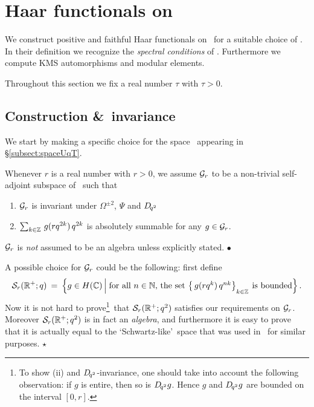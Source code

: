 
\section{Haar functionals on \protect\Uqext}

\begin{abs_chp}
We construct positive and faithful Haar functionals on \UqT\ for a suitable choice of \calL\@.
In their definition we recognize the {\em spectral conditions\/} of
\cite{Fons:spectral_conditions,Wor:QE2}\@.
Furthermore we compute {\scriptsize KMS} automorphisms and modular elements.
\end{abs_chp}

Throughout this section we fix a real number $\tau$ with $\tau>0$.


\subsection{Construction \&\ invariance}
\label{par:Haar:Uq:construction}

We start by making a specific choice for the space \calL\ appearing
in \S\ref{subsect:spaceUqT}\@.


\begin{assume} \label{assume:Gr} \rm
Whenever $r$ is a real number with $r>0$, we assume $\mathcal G_r$ to be a
non-trivial self-adjoint subspace of \HC\ such that
\begin{enumerate}
\item $\mathcal G_r$ is invariant under $\Omega^{\pm 2}$, $\Psi$ and $D_{\!q^2}$
\item $\sum_{k \in \mathbb{Z}} \, g(r q^{2k})\, q^{2k} $
      is absolutely summable for any $g\in \mathcal G_r$.
\end{enumerate}
$\mathcal G_r$ is {\em not\/} assumed to be an algebra unless explicitly stated.
\hfill $\bullet$
\end{assume}


\begin{ex} \label{ex:Schwartz-like_space}
\rm A possible choice for $\mathcal G_r$ could be the following: first define
$$ {\mathcal S}_r(\RR^+;q)
    \:=\: \left\{ g \in \HC \left|\vertL \right.
          \mbox{for all $n \in \NN$, the set
          $\left\{\,g(r q^k)\,q^{nk} \right\}_{_{\scriptstyle k \in \ZZ}}$
          is bounded} \right\}.$$
Now it is not hard to
prove\footnote{To show (ii) and \mbox{$D_{\!q^2}$-invariance},
one should take into account the following observation:
if $g$ is entire, then so is $D_{\!q^2} g$. Hence $g$ and $D_{\!q^2} g$
are bounded on the interval $[0,r]$.}\
that ${\mathcal S}_r(\mathbb{R}^+;q^2)$ satisfies our requirements on $\mathcal G_r$.
Moreover ${\mathcal S}_r(\mathbb{R}^+;q^2)$ is in fact an {\em algebra\/}, and furthermore
it is easy to prove that it is actually equal to the \lq Schwartz-like\rq\ space
that was used in \cite{Koelink:thesis,Koelink:QE2}\ for similar purposes.
\hfill $\star$
\end{ex}


